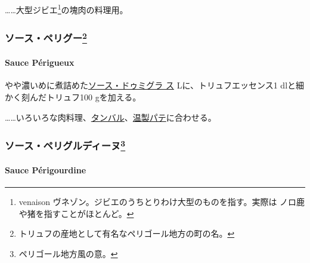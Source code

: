 \begin{recette}
\ldots{}\ldots{}大型ジビエ\footnote{venaison
  ヴネゾン。ジビエのうちとりわけ大型のものを指す。実際は
  ノロ鹿や猪を指すことがほとんど。}の塊肉の料理用。

\maeaki

\hypertarget{ux30bdux30fcux30b9ux30daux30eaux30b0ux30fc59}{%
\subsubsection[ソース・ペリグー]{\texorpdfstring{ソース・ペリグー\footnote{トリュフの産地として有名なペリゴール地方の町の名。}}{ソース・ペリグー}}\label{ux30bdux30fcux30b9ux30daux30eaux30b0ux30fc59}}

\hypertarget{sauce-perigueux}{%
\paragraph{Sauce Périgueux}\label{sauce-perigueux}}


やや濃いめに煮詰めた\protect\hyperlink{sauce-demi-glace}{ソース・ドゥミグラ
ス}\troisquarts{} Lに、トリュフエッセンス1 \undemi{}
dlと細かく刻んだトリュフ100 gを加える。

\ldots{}\ldots{}いろいろな肉料理、\protect\hyperlink{}{タンバル}、\protect\hyperlink{}{温製パテ}に合わせる。

\maeaki

\hypertarget{ux30bdux30fcux30b9ux30daux30eaux30b0ux30ebux30c7ux30a3ux30fcux30cc60}{%
\subsubsection[ソース・ペリグルディーヌ]{\texorpdfstring{ソース・ペリグルディーヌ\footnote{ペリゴール地方風の意。}}{ソース・ペリグルディーヌ}}\label{ux30bdux30fcux30b9ux30daux30eaux30b0ux30ebux30c7ux30a3ux30fcux30cc60}}

\hypertarget{sauce-puxe9rigourdine}{%
\paragraph{Sauce Périgourdine}\label{sauce-puxe9rigourdine}}


\end{recette}
